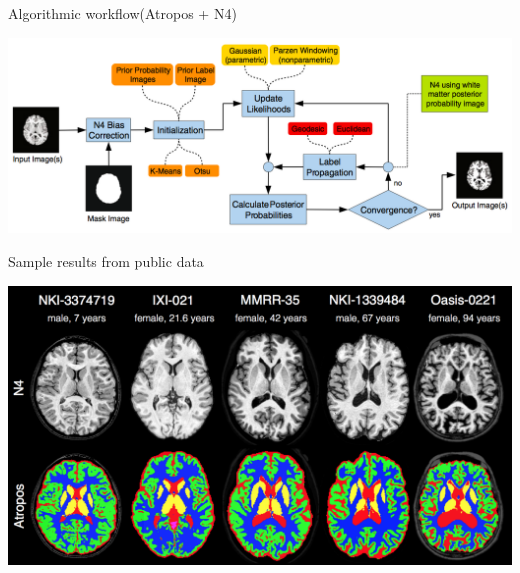 \documentclass[ignorenonframetext,]{beamer}
\begin{document}
\begin{frame}{Algorithmic workflow(Atropos + N4)}

\includegraphics{./Figs/atroposFlow.png}

\end{frame}

\begin{frame}{Sample results from public data}

\includegraphics{./Figs/sampleAtroposVisualResults.png}

\end{frame}
\end{document}
